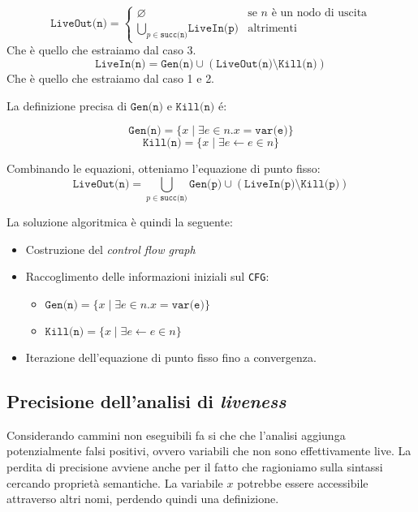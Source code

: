 \begin{equation}
    \texttt{LiveOut(n)} = 
    \begin{cases}
        \varnothing & \text{se $n$ è un nodo di uscita}\\
        \bigcup_{p \in \texttt{succ(n)}} \texttt{LiveIn(p)} & \text{altrimenti}
    \end{cases}
\end{equation}
Che è quello che estraiamo dal caso 3.
\begin{equation}
    \texttt{LiveIn(n)} = \texttt{Gen(n)} \cup (\texttt{LiveOut(n)} \setminus \texttt{Kill(n)})
\end{equation}
Che è quello che estraiamo dal caso 1 e 2.

La definizione precisa di $\texttt{Gen(n)}$ e $\texttt{Kill(n)}$ é:


\begin{equation}
    \texttt{Gen(n)} = \{x \mid \exists e \in n . x = \texttt{var(e)}\}
\end{equation}
\begin{equation}
    \texttt{Kill(n)} = \{x \mid \exists e \gets e \in n\}
\end{equation}
\begin{tcolorbox}[title = Equazione di punto fisso]
    Combinando le equazioni, otteniamo l'equazione di punto fisso:
\begin{equation}
    \texttt{LiveOut(n)} = \bigcup_{p \in \texttt{succ(n)}} \texttt{Gen(p)} \cup (\texttt{LiveIn(p)}
    \setminus \texttt{Kill(p)})
\end{equation}
\end{tcolorbox}
La soluzione algoritmica è quindi la seguente:
\begin{itemize}
    \item Costruzione del \textit{control flow graph}
    \item Raccoglimento delle informazioni iniziali sul \texttt{CFG}:
    \begin{itemize}
        \item $ \texttt{Gen(n)} = \{x \mid \exists e \in n . x = \texttt{var(e)}\}$
        \item $\texttt{Kill(n)} = \{x \mid \exists e \gets e \in n\}$
    \end{itemize}
    \item Iterazione dell'equazione di punto fisso fino a convergenza.
\end{itemize}
\subsection{Precisione dell'analisi di \textit{liveness}}
Considerando cammini non eseguibili fa si che che l'analisi aggiunga potenzialmente
falsi positivi, ovvero variabili che non sono effettivamente live. La perdita di 
precisione avviene anche per il fatto che ragioniamo sulla sintassi cercando 
proprietà semantiche. La variabile $x$ potrebbe essere accessibile attraverso 
altri nomi, perdendo quindi una definizione.
